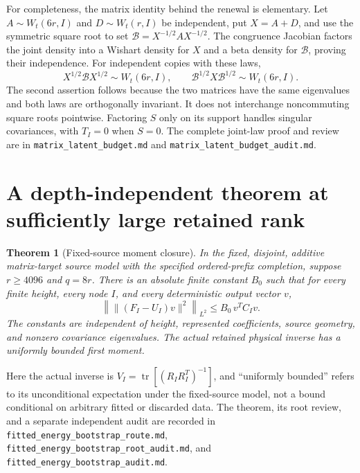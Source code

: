 \documentclass[11pt,oneside,openany,a4paper]{book}
\numberwithin{equation}{chapter}
\newtheorem{theorem}{Theorem}[chapter]
\theoremstyle{definition}
\theoremstyle{remark}
\DeclareMathOperator{\tr}{tr}\DeclareMathOperator{\rank}{rank}
\newcommand{\sourcefile}[1]{{\small\nolinkurl{#1}}}
\begin{document}
For completeness, the matrix identity behind the renewal is elementary.
Let $A\sim W_t(6r,I)$ and $D\sim W_t(r,I)$ be independent, put
$X=A+D$, and use the symmetric square root to set
$\mathcal B=X^{-1/2}AX^{-1/2}$.  The congruence Jacobian factors the
joint density into a Wishart density for $X$ and a beta density for
$\mathcal B$, proving their independence.  For independent copies
with these laws,
\[
 X^{1/2}\mathcal B X^{1/2}\sim W_t(6r,I),
 \qquad
 \mathcal B^{1/2}X\mathcal B^{1/2}\sim W_t(6r,I).
\]
The second assertion follows because the two matrices have the same
eigenvalues and both laws are orthogonally invariant.  It does not
interchange noncommuting square roots pointwise.  Factoring $S$ only
on its support handles singular covariances, with $T_I=0$ when $S=0$.
The complete joint-law proof and review are in
\sourcefile{matrix_latent_budget.md} and
\sourcefile{matrix_latent_budget_audit.md}.

\section{A depth-independent theorem at sufficiently large retained rank}

\begin{theorem}[Fixed-source moment closure]
\label{upd:thm:route-source-large-rank}
In the fixed, disjoint, additive matrix-target source model with the
specified ordered-prefix completion, suppose $r\geq4096$ and $q=8r$.
There is an absolute finite constant $B_0$ such that for every finite
height, every node $I$, and every deterministic output vector $v$,
\begin{equation}
 \left\|\lVert(F_I-U_I)v\rVert^2\right\|_{L^2}
 \leq B_0\,v^TC_Iv.
 \label{upd:eq:route-large-rank-energy}
\end{equation}
The constants are independent of height, represented coefficients,
source geometry, and nonzero covariance eigenvalues.  The actual
retained physical inverse has a uniformly bounded first moment.
\end{theorem}

Here the actual inverse is
$V_I=\tr[(R_IR_I^T)^{-1}]$, and ``uniformly bounded'' refers to its
unconditional expectation under the fixed-source model, not a bound
conditional on arbitrary fitted or discarded data.  The theorem,
its root review, and a separate independent audit are recorded in
\sourcefile{fitted_energy_bootstrap_route.md},
\sourcefile{fitted_energy_bootstrap_root_audit.md}, and
\sourcefile{fitted_energy_bootstrap_audit.md}.
\end{document}
